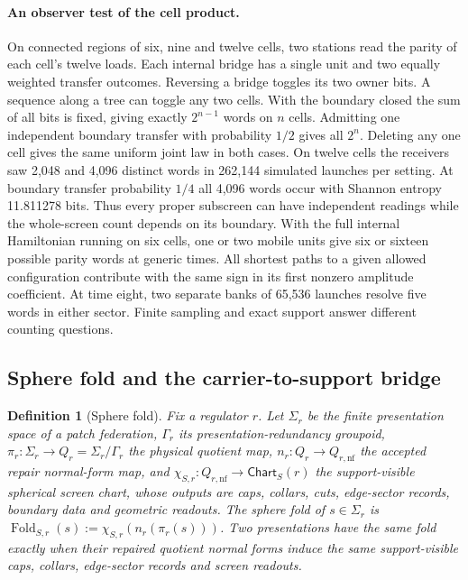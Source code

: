 \documentclass[11pt]{article}
\newtheorem{definition}[theorem]{Definition}
\theoremstyle{remark}
\theoremstyle{plain}
\begin{document}
\paragraph{An observer test of the cell product.}
On connected regions of six, nine and twelve cells, two stations read the
parity of each cell's twelve loads. Each internal bridge has a single unit
and two equally weighted transfer outcomes. Reversing a bridge toggles its
two owner bits. A sequence along a tree can toggle any two cells. With the
boundary closed the sum of all bits is fixed, giving exactly $2^{n-1}$
words on $n$ cells. Admitting one independent boundary transfer with
probability $1/2$ gives all $2^n$. Deleting any one cell gives the same
uniform joint law in both cases. On twelve cells the receivers saw
2,048 and 4,096 distinct words in 262,144 simulated launches per setting.
At boundary transfer probability $1/4$ all 4,096 words occur with Shannon
entropy 11.811278 bits. Thus every proper subscreen can have independent
readings while the whole-screen count depends on its boundary.
With the full internal Hamiltonian running on six cells, one or two mobile
units give six or sixteen possible parity words at generic times. All
shortest paths to a given allowed configuration contribute with the same
sign in its first nonzero amplitude coefficient. At time eight, two
separate banks of 65,536 launches resolve five words in either sector.
Finite sampling and exact support answer different counting questions.



\subsection{Sphere fold and the carrier-to-support bridge}

\begin{definition}[Sphere fold]\label{def:sphere-fold}
Fix a regulator \(r\). Let \(\Sigma_r\) be the finite presentation space of a
patch federation, \(\Gamma_r\) its presentation-redundancy groupoid,
\(\pi_r:\Sigma_r\to Q_r=\Sigma_r/\Gamma_r\) the physical quotient map,
\(n_r:Q_r\to Q_{r,\mathrm{nf}}\) the accepted repair normal-form map, and
\(\chi_{S,r}:Q_{r,\mathrm{nf}}\to\mathsf{Chart}_S(r)\) the support-visible
spherical screen chart, whose outputs are caps, collars, cuts, edge-sector
records, boundary data and geometric readouts. The sphere fold of
\(s\in\Sigma_r\) is
\(\operatorname{Fold}_{S,r}(s):=\chi_{S,r}(n_r(\pi_r(s)))\). Two
presentations have the same fold exactly when their repaired quotient normal
forms induce the same support-visible caps, collars, edge-sector records and
screen readouts.
\end{definition}
\end{document}
